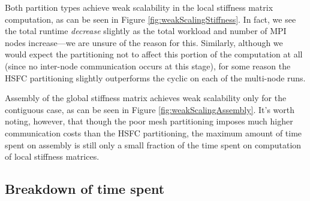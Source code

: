 \documentclass{article}
\begin{document}
Both partition types achieve weak scalability in the local stiffness matrix computation, as can be seen in Figure \ref{fig:weakScalingStiffness}.  In fact, we see the total runtime \emph{decrease} slightly as the total workload and number of MPI nodes increase---we are unsure of the reason for this. Similarly, although we would expect the partitioning not to affect this portion of the computation at all (since no inter-node communication occurs at this stage), for some reason the HSFC partitioning slightly outperforms the cyclic on each of the multi-node runs.

Assembly of the global stiffness matrix achieves weak scalability only for the contiguous case, as can be seen in Figure \ref{fig:weakScalingAssembly}. It's worth noting, however, that though the poor mesh partitioning imposes much higher communication costs than the HSFC partitioning, the maximum amount of time spent on assembly is still only a small fraction of the time spent on computation of local stiffness matrices.

\subsection{Breakdown of time spent}
\end{document}
